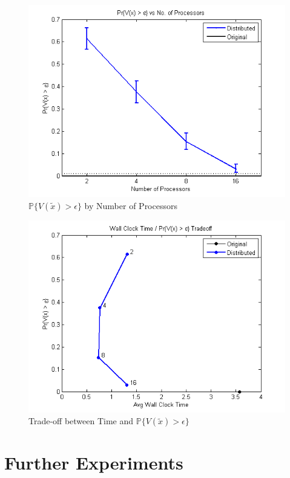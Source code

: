 \documentclass[12pt]{article}
\begin{document}
\begin{figure}[ht]
	\centering
		\includegraphics{../plot/figs/probviolprobgreateps_numproc.png}
	\caption{$\mathbb{P}\{V(\tilde{x}) > \epsilon \}$ by Number of Processors}
	\label{fig:probviolprobgreateps_numproc}
\end{figure}

\begin{figure}[ht]
	\centering
		\includegraphics{../plot/figs/wct_probviolprobgreateps_frontier.png}
	\caption{Trade-off between Time and $\mathbb{P}\{V(\tilde{x}) > \epsilon \}$}
	\label{fig:wct_probviolprobgreateps_frontier}
\end{figure}

\section*{Further Experiments}
\end{document}

